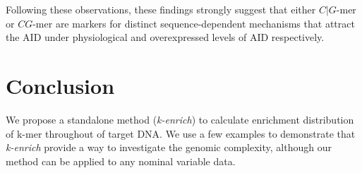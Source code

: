 \documentclass{bioinfo}
\begin{document}
Following these observations, these findings strongly suggest that
either $C|G$-mer or $CG$-mer are markers for distinct
sequence-dependent mechanisms that attract the AID under physiological
and overexpressed levels of AID respectively.

\section{Conclusion}
We propose a standalone method ({\it k-enrich}) to calculate
enrichment distribution of k-mer throughout of target DNA. We use a
few examples to demonstrate that {\it k-enrich} provide a way to
investigate the genomic complexity, although our method can be applied
to any nominal variable data.



\scriptsize{
   
\normalsize
}
\end{document}
